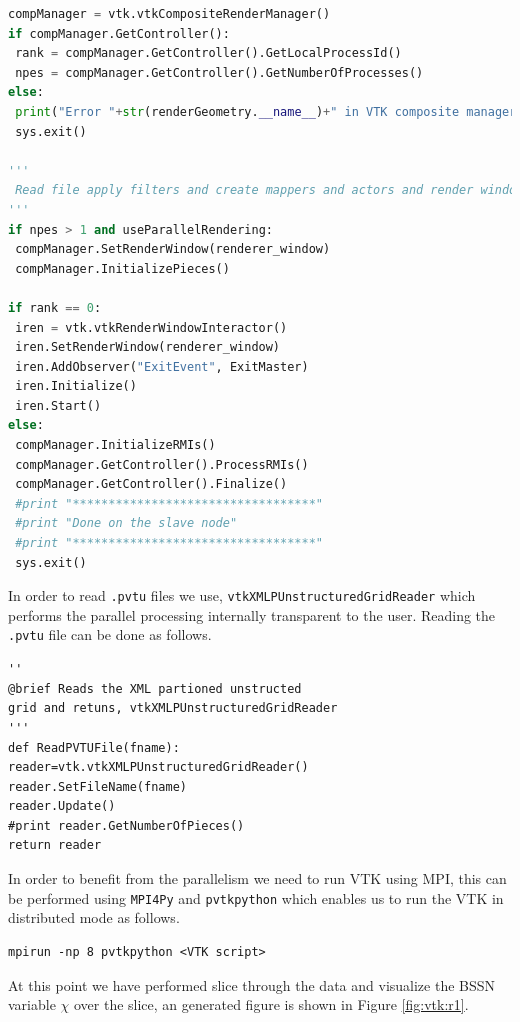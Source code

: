 \begin{lstlisting}[language=Python]
compManager = vtk.vtkCompositeRenderManager()
if compManager.GetController():
 rank = compManager.GetController().GetLocalProcessId()
 npes = compManager.GetController().GetNumberOfProcesses()
else:
 print("Error "+str(renderGeometry.__name__)+" in VTK composite manager")        
 sys.exit()

'''
 Read file apply filters and create mappers and actors and render windows. 
'''	 
if npes > 1 and useParallelRendering:
 compManager.SetRenderWindow(renderer_window)
 compManager.InitializePieces()

if rank == 0:
 iren = vtk.vtkRenderWindowInteractor()
 iren.SetRenderWindow(renderer_window)
 iren.AddObserver("ExitEvent", ExitMaster)
 iren.Initialize()
 iren.Start()
else:
 compManager.InitializeRMIs()
 compManager.GetController().ProcessRMIs()
 compManager.GetController().Finalize()
 #print "**********************************"
 #print "Done on the slave node"
 #print "**********************************"
 sys.exit()
\end{lstlisting}


In order to read \texttt{.pvtu} files we use, \texttt{vtkXMLPUnstructuredGridReader} which performs the parallel processing internally transparent to the user. Reading the \texttt{.pvtu} file can be done as follows. 
\begin{lstlisting}[basicstyle=\small]
''
@brief Reads the XML partioned unstructed 
grid and retuns, vtkXMLPUnstructuredGridReader
'''
def ReadPVTUFile(fname):
reader=vtk.vtkXMLPUnstructuredGridReader()
reader.SetFileName(fname)
reader.Update()
#print reader.GetNumberOfPieces()
return reader
\end{lstlisting}

In order to benefit from the parallelism we need to run VTK using MPI, this can be performed using \texttt{MPI4Py} and \texttt{pvtkpython} which enables us to run the VTK in distributed mode as follows.
\begin{lstlisting}[basicstyle=\small]
mpirun -np 8 pvtkpython <VTK script>
\end{lstlisting} 

At this point we have performed slice through the data and visualize the BSSN variable $\chi$ over the slice, an generated figure is shown in Figure \ref{fig:vtk:r1}. 

